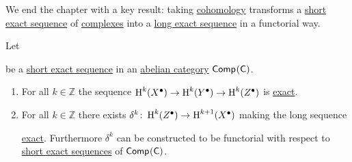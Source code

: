 \documentclass[../../main]{subfiles}
\begin{document}
We end the chapter with a key result: taking \hyperref[def:cohomology]{cohomology} transforms a \hyperref[def:exact-sequence]{short exact sequence} of \hyperref[def:complex]{complexes} into a \hyperref[def:exact-sequence]{long exact sequence} in a functorial way.
\begin{theorem}\label{thm:LES-in-cohomology}
  Let
  \begin{center}
  \end{center}
  be a \hyperref[def:exact-sequence]{short exact sequence} in an \hyperref[def:abelian-category]{abelian category} \(\mathsf{Comp}^{}(\mathsf{C})\).
  \begin{enumerate}
    \item For all \(k \in \mathbb{Z}\) the sequence \(\operatorname{H}^{k}(X^{\bullet}) \to \operatorname{H}^{k}(Y^{\bullet}) \to \operatorname{H}^{k}(Z^{\bullet})\) is \hyperref[def:exact-sequence]{exact}.
    \item For all \(k \in \mathbb{Z}\) there exists \(\delta^{k}\colon \operatorname{H}^{k}(Z^{\bullet}) \to \operatorname{H}^{k+1}(X^{\bullet})\) making the long sequence
          \begin{center}
          \end{center}
          \hyperref[def:exact-sequence]{exact}.
          Furthermore \(\delta^{k}\) can be constructed to be functorial with respect to \hyperref[def:exact-sequence]{short exact sequences} of \(\mathsf{Comp}^{}(\mathsf{C})\).
  \end{enumerate}
\end{theorem}
\end{document}
